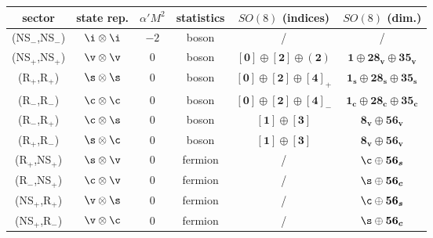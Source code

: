 \begin{tabular}{|c|c|c|c|c|c|}
	\hline    sector & state rep.      & $\alpha' M^2$ & statistics & $SO(8)$ (indices)                                                    & $SO(8)$ (dim.)                                                       \\ \hline
	(NS$_-$,NS$_-$)  & $\i \otimes \i$ & $-2$          & boson      & /                                                                    & /                                                                    \\ \hline
	(NS$_+$,NS$_+$)  & $\v \otimes \v$ & $0$           & boson      & $[\boldsymbol{0}] \oplus [\boldsymbol{2}] \oplus (\boldsymbol{2})$   & $\boldsymbol{1} \oplus \boldsymbol{28_v} \oplus \boldsymbol{35_v}$   \\ \hline
	(R$_+$,R$_+$)    & $\s\otimes \s$  & $0$           & boson      & $[\boldsymbol{0}] \oplus [\boldsymbol{2}] \oplus [\boldsymbol{4}]_+$ & $\boldsymbol{1_s} \oplus \boldsymbol{28_s} \oplus \boldsymbol{35_s}$ \\ \hline
	(R$_-$,R$_-$)    & $\c \otimes \c$ & $0$           & boson      & $[\boldsymbol{0}] \oplus [\boldsymbol{2}] \oplus [\boldsymbol{4}]_-$ & $\boldsymbol{1_c} \oplus \boldsymbol{28_c} \oplus \boldsymbol{35_c}$ \\ \hline
	(R$_-$,R$_+$)    & $\c \otimes \s$ & $0$           & boson      & $[\boldsymbol{1}] \oplus [\boldsymbol{3}]$                           & $\boldsymbol{8_v} \oplus \boldsymbol{56_v}$                          \\ \hline
	(R$_+$,R$_-$)    & $\s \otimes \c$ & $0$           & boson      & $[\boldsymbol{1}] \oplus [\boldsymbol{3}]$                           & $\boldsymbol{8_v} \oplus \boldsymbol{56_v}$                          \\ \hline
	(R$_+$,NS$_+$)   & $\s \otimes \v$ & $0$           & fermion    & /                                                                    & $\c \oplus \boldsymbol{56_s}$                                        \\ \hline
	(R$_-$,NS$_+$)   & $\c \otimes \v$ & $0$           & fermion    & /                                                                    & $\s \oplus \boldsymbol{56_c}$                                        \\ \hline
	(NS$_+$,R$_+$)   & $\v\otimes\s$   & $0$           & fermion    & /                                                                    & $\c \oplus \boldsymbol{56_s}$                                        \\ \hline
	(NS$_+$,R$_-$)   & $\v\otimes\c$   & $0$           & fermion    & /                                                                    & $\s \oplus \boldsymbol{56_c}$                                        \\ \hline
\end{tabular}